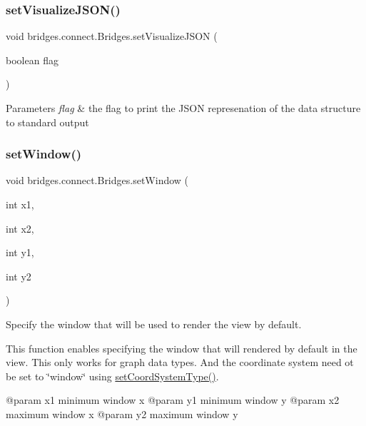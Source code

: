 \subsubsection{\texorpdfstring{set\+Visualize\+J\+S\+O\+N()}{setVisualizeJSON()}}
{\footnotesize\ttfamily void bridges.\+connect.\+Bridges.\+set\+Visualize\+J\+S\+ON (\begin{DoxyParamCaption}\item[{boolean}]{flag }\end{DoxyParamCaption})}


\begin{DoxyParams}{Parameters}
{\em flag} & the flag to print the J\+S\+ON represenation of the data structure to standard output \\
\hline
\end{DoxyParams}
\mbox{\label{classbridges_1_1connect_1_1_bridges_ac2f9a8d7852e499a7ed3521f06d470bf}} 
\subsubsection{\texorpdfstring{set\+Window()}{setWindow()}\hspace{0.1cm}{\footnotesize\ttfamily [1/3]}}
{\footnotesize\ttfamily void bridges.\+connect.\+Bridges.\+set\+Window (\begin{DoxyParamCaption}\item[{int}]{x1,  }\item[{int}]{x2,  }\item[{int}]{y1,  }\item[{int}]{y2 }\end{DoxyParamCaption})}



Specify the window that will be used to render the view by default. 

This function enables specifying the window that will rendered by default in the view. This only works for graph data types. And the coordinate system need ot be set to \char`\"{}window\char`\"{} using \hyperlink{classbridges_1_1connect_1_1_bridges_ade4a9c43e2b608e6b3dc774b73f95749}{set\+Coord\+System\+Type()}. \begin{DoxyVerb}@param x1   minimum window x
@param y1   minimum window y
@param x2   maximum window x
@param y2   maximum window y\end{DoxyVerb}
 \mbox{\label{classbridges_1_1connect_1_1_bridges_afff6882285f7615b775c59b2fc62b1c3}} 
